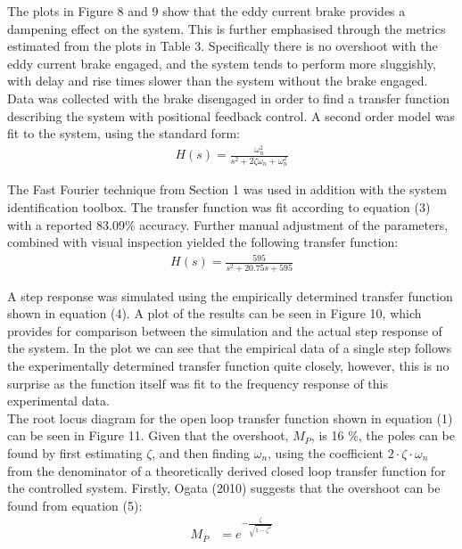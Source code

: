 \documentclass{article}
\begin{document}
The plots in Figure 8 and 9 show that the eddy current brake provides a dampening effect on the system. This is further emphasised through the metrics estimated from the plots in Table 3. Specifically there is no overshoot with the eddy current brake engaged, and the system tends to perform more sluggishly, with delay and rise times slower than the system without the brake engaged. Data was collected with the brake disengaged in order to find a transfer function describing the system with positional feedback control. A second order model was fit to the system, using the standard form:
\begin{align}
	H(s) = \frac{\omega_n^2}{s^2 + 2 \zeta \omega_n + \omega_n^2}
\end{align}

The Fast Fourier technique from Section 1 was used in addition with the system identification toolbox. The transfer function was fit according to equation (3) with a reported 83.09\% accuracy. Further manual adjustment of the parameters, combined with visual inspection yielded the following transfer function:
\begin{align}
H(s) = \frac{595}{s^2 + 20.75s + 595}
\end{align}

A step response was simulated using the empirically determined transfer function shown in equation (4). A plot of the results can be seen in Figure 10, which provides for comparison between the simulation and the actual step response of the system. In the plot we can see that the empirical data of a single step follows the experimentally determined transfer function quite closely, however, this is no surprise as the function itself was fit to the frequency response of this experimental data.\\

The root locus diagram for the open loop transfer function shown in equation (1) can be seen in Figure 11. Given that the overshoot, $M_P$, is 16 \%, the poles can be found by first estimating $\zeta$, and then finding $\omega_n$, using the coefficient $2 \cdot \zeta \cdot \omega_n$ from the denominator of a theoretically derived closed loop transfer function for the controlled system. Firstly, Ogata (2010) suggests that the overshoot can be found from equation (5):
\begin{align}
M_P &= e^{-\frac{\zeta}{\sqrt{1-\zeta^2}}}
\end{align}
\end{document}
